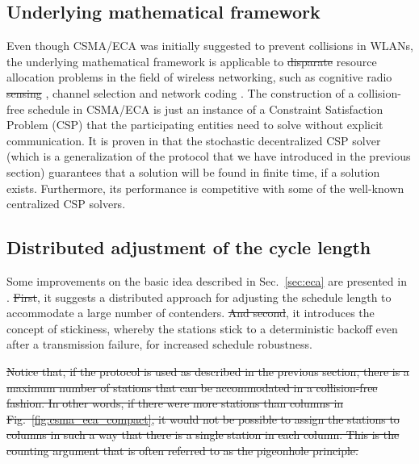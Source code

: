 \documentclass[journal]{IEEEtran}
\providecommand{\DIFadd}[1]{{\protect\color{blue}\uwave{#1}}} %
\providecommand{\DIFdel}[1]{{\protect\color{red}\sout{#1}}}                      %
\providecommand{\DIFaddbegin}{} %
\providecommand{\DIFaddend}{} %
\providecommand{\DIFdelbegin}{} %
\providecommand{\DIFdelend}{} %
\begin{document}
\subsection{Underlying mathematical framework}
Even though CSMA/ECA was initially suggested to prevent collisions in WLANs, the underlying mathematical framework is applicable to \DIFdelbegin \DIFdel{disparate }\DIFdelend \DIFaddbegin \DIFadd{a variety of }\DIFaddend resource allocation problems in the field of wireless networking, such as cognitive radio \DIFdelbegin \DIFdel{sensing }\DIFdelend \cite{khan2013aso}, channel selection and network coding \cite{duffy2011dcs}.
The construction of a collision-free schedule in CSMA/ECA is \DIFaddbegin \DIFadd{in fact }\DIFaddend just an instance of a Constraint Satisfaction Problem (CSP) that the participating entities need to solve without explicit communication.
It is proven in \cite{duffy2011dcs} that the stochastic decentralized CSP solver (which is a generalization of the protocol that we have introduced in the previous section) guarantees that a solution will be found in finite time, if a solution exists.
Furthermore, its performance is competitive with some of the well-known centralized CSP solvers.

\subsection{Distributed adjustment of the cycle length}

Some improvements on the basic idea described in Sec.~\ref{sec:eca} are presented in \cite{fang2011dlm}. 
\DIFdelbegin \DIFdel{First}\DIFdelend \DIFaddbegin \DIFadd{Namely}\DIFaddend , it suggests a distributed approach for adjusting the schedule length to accommodate a large number of contenders.
\DIFdelbegin \DIFdel{And second}\DIFdelend \DIFaddbegin \DIFadd{Furthermore}\DIFaddend , it introduces the concept of stickiness, whereby the stations stick to a deterministic backoff even after a transmission failure, for increased schedule robustness. 

\DIFdelbegin \DIFdel{Notice that, if the protocol is used as described in the previous section, there is a maximum number of stations that can be accommodated in a collision-free fashion.
In other words, if there were more stations than columns in Fig.~\ref{fig:csma_eca_compact}, it would not be possible to assign the stations to columns in such a way that there is a single station in each column.
This is the counting argument that is often referred to as the pigeonhole principle.
}\DIFdelend %
\end{document}
